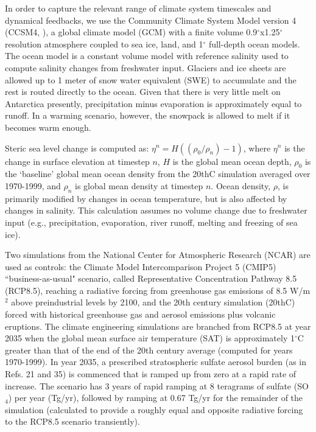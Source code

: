 \documentclass{nature}
\begin{document}
\begin{methods}

In order to capture the relevant range of climate system timescales and dynamical feedbacks, we use the Community Climate System Model version 4 (CCSM4, \cite{gent11}), a global climate model (GCM) with a finite volume 0.9$^\circ$x1.25$^\circ$ resolution atmosphere coupled to sea ice, land, and 1$^\circ$ full-depth ocean models. The ocean model is a constant volume model with reference salinity used to compute salinity changes from freshwater input. Glaciers and ice sheets are allowed up to 1 meter of snow water equivalent (SWE) to accumulate and the rest is routed directly to the ocean. Given that there is very little melt on Antarctica presently, precipitation minus evaporation is approximately equal to runoff. In a warming scenario, however, the snowpack is allowed to melt if it becomes warm enough.  

Steric sea level change is computed as: $\eta^n = H((\rho_0 / \rho_n) -1)$, where $\eta^n$ is the change in surface elevation at timestep $n$, $H$ is the global mean ocean depth, $\rho_0$ is the `baseline' global mean ocean density from the 20thC simulation averaged over 1970-1999, and $\rho_n$ is global mean density at timestep $n$. Ocean density, $\rho$, is primarily modified by changes in ocean temperature, but is also affected by changes in salinity. This calculation assumes no volume change due to freshwater input (e.g., precipitation, evaporation, river runoff, melting and freezing of sea ice).

Two simulations from the National Center for Atmospheric Research (NCAR) are used as controls: the Climate Model Intercomparison Project 5 (CMIP5) ``business-as-usual" scenario, called Representative Concentration Pathway 8.5 (RCP8.5), reaching a radiative forcing from greenhouse gas emissions of 8.5 W/m$^{2}$ above preindustrial levels by 2100, and the 20th century simulation (20thC) forced with historical greenhouse gas and aerosol emissions plus volcanic eruptions. The climate engineering simulations are branched from RCP8.5 at year 2035 when the global mean surface air temperature (SAT) is approximately 1$^\circ$C greater than that of the end of the 20th century average (computed for years 1970-1999). In year 2035, a prescribed stratospheric sulfate aerosol burden (as in Refs. 21 and 35) is commenced that is ramped up from zero at a rapid rate of increase. The scenario has 3 years of rapid ramping at 8 teragrams of sulfate (SO$_4$) per year (Tg/yr), followed by ramping at 0.67 Tg/yr for the remainder of the simulation (calculated to provide a roughly equal and opposite radiative forcing to the RCP8.5 scenario transiently). 


\end{methods}
\end{document}
